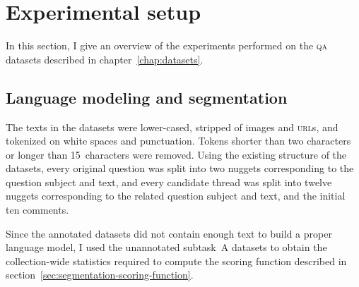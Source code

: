 \documentclass[
  digital, %
  notable, %
  lof,     %
  lot,     %
  nopalatino, color
]{fithesis3}
\def\abbr#1{\textsc{\MakeLowercase{#1}}}
\begin{document}
\section{Experimental setup}
\label{sec:segmentation-experimental-setup}
In this section, I give an overview of the experiments performed on the
\abbr{QA}\index{qa@\abbr{QA}} datasets described in chapter~\ref{chap:datasets}.

\subsection{Language modeling and segmentation}
\label{sec:segmentation-language-modeling-segmentation}
The texts in the datasets were lower-cased, stripped of images and \abbr{URL}s,
and tokenized on white spaces and punctuation. Tokens shorter than two
characters or longer than 15~characters were removed. Using the existing
structure of the datasets, every original question was split into two nuggets
corresponding to the question subject and text, and every candidate thread was
split into twelve nuggets corresponding to the related question subject and
text, and the initial ten comments.

Since the annotated datasets did not contain enough text to build a proper
language model, I used the unannotated subtask~A datasets to obtain the
collection-wide statistics required to compute the scoring function described
in section~\ref{sec:segmentation-scoring-function}.
\end{document}
